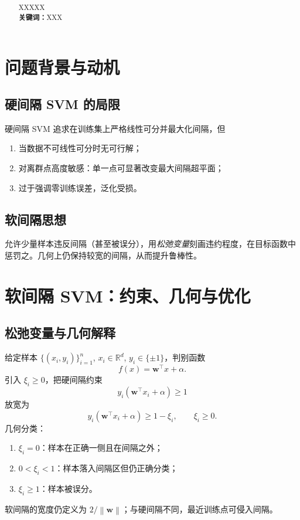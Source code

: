 \documentclass[10.5pt,hyperref,a4paper,UTF8]{ctexart}
\newcommand{\R}{\mathbb{R}}
\newcommand{\norm}[1]{\left\lVert #1\right\rVert}
\theoremstyle{definition}
\begin{document}
\cover

\begin{abstract}
%
XXXXX\\
\textbf{关键词：}XXX
%
\end{abstract}

\newpage
\tableofcontents
\thispagestyle{empty} %

\newpage
\setcounter{page}{1} %

\begin{center}
    \title{ \Huge \textbf{} }
\end{center}


\thispagestyle{empty} %


\section{问题背景与动机}
\subsection{硬间隔 SVM 的局限}
硬间隔 SVM 追求在训练集上严格线性可分并最大化间隔，但
\begin{enumerate}
  \item 当数据不可线性可分时无可行解；
  \item 对离群点高度敏感：单一点可显著改变最大间隔超平面；
  \item 过于强调零训练误差，泛化受损。
\end{enumerate}

\subsection{软间隔思想}
允许少量样本违反间隔（甚至被误分），用\emph{松弛变量}刻画违约程度，在目标函数中惩罚之。几何上仍保持较宽的间隔，从而提升鲁棒性。

\section{软间隔 SVM：约束、几何与优化}
\subsection{松弛变量与几何解释}
给定样本 $\{(x_i,y_i)\}_{i=1}^n$, $x_i\in\R^d$, $y_i\in\{\pm1\}$，判别函数
\[
f(x)=\bm w^\top x+\alpha.
\]
引入 $\xi_i\ge0$，把硬间隔约束
\[
y_i(\bm w^\top x_i+\alpha)\ge1
\]
放宽为
\[
y_i(\bm w^\top x_i+\alpha)\ge1-\xi_i,\qquad \xi_i\ge0.
\]
几何分类：
\begin{enumerate}
  \item $\xi_i=0$：样本在正确一侧且在间隔之外；
  \item $0<\xi_i<1$：样本落入间隔区但仍正确分类；
  \item $\xi_i\ge1$：样本被误分。
\end{enumerate}
软间隔的宽度仍定义为 $2/\norm{\bm w}$；与硬间隔不同，最近训练点可侵入间隔。
\end{document}
